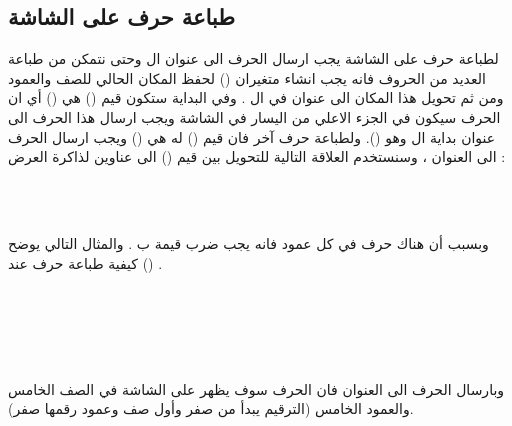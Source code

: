 \documentclass[document.tex]{subfiles}
\begin{document}
\begin{english}
\lstset{numberstyle=\tiny,numbersep=5pt,tabsize=2,extendedchars=true,breaklines=true,frame=b,showspaces=false, showtabs=false,xleftmargin=10pt,framexleftmargin=10pt,framexrightmargin=5pt,framexbottommargin=4pt,showstringspaces=false,language=[x86masm]Assembler}


\end{english}

\subsection{طباعة حرف على الشاشة}
لطباعة حرف على الشاشة يجب ارسال الحرف الى عنوان ال  وحتى نتمكن من طباعة العديد من الحروف فانه يجب انشاء متغيران () لحفظ المكان الحالي للصف والعمود ومن ثم تحويل هذا المكان الى عنوان في ال . وفي البداية ستكون قيم () هي () أي ان الحرف سيكون في الجزء الاعلي من اليسار في الشاشة ويجب ارسال هذا الحرف الى عنوان بداية ال  وهو  (). ولطباعة حرف آخر فان قيم () له هي ()  ويجب ارسال الحرف الى العنوان  ، وسنستخدم العلاقة التالية للتحويل بين قيم () الى عناوين لذاكرة العرض :

\begin{english}
\\
\\
\end{english}

وبسبب أن هناك  حرف في كل عمود فانه يجب ضرب قيمة  ب  . والمثال التالي يوضح كيفية طباعة حرف عند () .

\begin{english}
\\

\\

\\

\\
\end{english}

وبارسال الحرف الى العنوان  فان الحرف سوف يظهر على الشاشة في الصف الخامس والعمود الخامس (الترقيم يبدأ من صفر وأول صف وعمود رقمها صفر).
 
\end{document}
